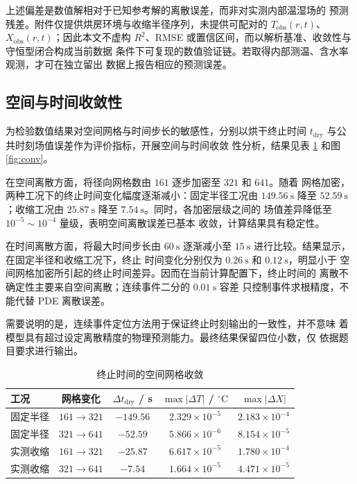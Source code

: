 \documentclass[withoutpreface,bwprint]{cumcmthesis}
\begin{document}
上述偏差是数值解相对于已知参考解的离散误差，而非对实测内部温湿场的
预测残差。附件仅提供烘房环境与收缩半径序列，未提供可配对的
$T_{\mathrm{obs}}(r,t)$、$X_{\mathrm{obs}}(r,t)$；因此本文不虚构
$R^2$、RMSE 或置信区间，而以解析基准、收敛性与守恒型闭合构成当前数据
条件下可复现的数值验证链。若取得内部测温、含水率观测，才可在独立留出
数据上报告相应的预测误差。

\subsection{空间与时间收敛性}

为检验数值结果对空间网格与时间步长的敏感性，分别以烘干终止时间
$t_{\mathrm{dry}}$ 与公共时刻场值误差作为评价指标，开展空间与时间收敛
性分析，结果见表 \ref{tab:conv} 和图 \ref{fig:conv}。

在空间离散方面，将径向网格数由 $161$ 逐步加密至 $321$ 和 $641$。随着
网格加密，两种工况下的终止时间变化幅度逐渐减小：固定半径工况由
$149.56\ \mathrm{s}$ 降至 $52.59\ \mathrm{s}$；收缩工况由
$25.87\ \mathrm{s}$ 降至 $7.54\ \mathrm{s}$。同时，各加密层级之间的
场值差异降低至 $10^{-5}\sim10^{-4}$ 量级，表明空间离散误差已基本
收敛，计算结果具有稳定性。

在时间离散方面，将最大时间步长由 $60\ \mathrm{s}$ 逐渐减小至
$15\ \mathrm{s}$ 进行比较。结果显示，在固定半径和收缩工况下，终止
时间变化分别仅为 $0.26\ \mathrm{s}$ 和 $0.12\ \mathrm{s}$，明显小于
空间网格加密所引起的终止时间差异。因而在当前计算配置下，终止时间的
离散不确定性主要来自空间离散；连续事件二分的 $0.01\ \mathrm{s}$ 容差
只控制事件求根精度，不能代替 PDE 离散误差。

需要说明的是，连续事件定位方法用于保证终止时刻输出的一致性，并不意味
着模型具有超过设定离散精度的物理预测能力。最终结果保留四位小数，仅
依据题目要求进行输出。

\begin{table}[htbp]
  \centering
  \setcounter{table}{8}
  \caption{终止时间的空间网格收敛}
  \label{tab:conv}
  \begin{tabular}{lcccc}
  \toprule
  工况 & 网格变化 & $\Delta t_{\mathrm{dry}}$ / s &
  $\max|\Delta T|$ / $^\circ\mathrm{C}$ & $\max|\Delta X|$ \\
  \midrule
  固定半径 & $161\rightarrow321$ & $-149.56$ &
  $2.329\times10^{-5}$ & $2.183\times10^{-4}$ \\
  固定半径 & $321\rightarrow641$ & $-52.59$ &
  $5.866\times10^{-6}$ & $8.154\times10^{-5}$ \\
  实测收缩 & $161\rightarrow321$ & $-25.87$ &
  $6.617\times10^{-5}$ & $1.780\times10^{-4}$ \\
  实测收缩 & $321\rightarrow641$ & $-7.54$ &
  $1.664\times10^{-5}$ & $4.471\times10^{-5}$ \\
  \bottomrule
  \end{tabular}
\end{table}
\end{document}
